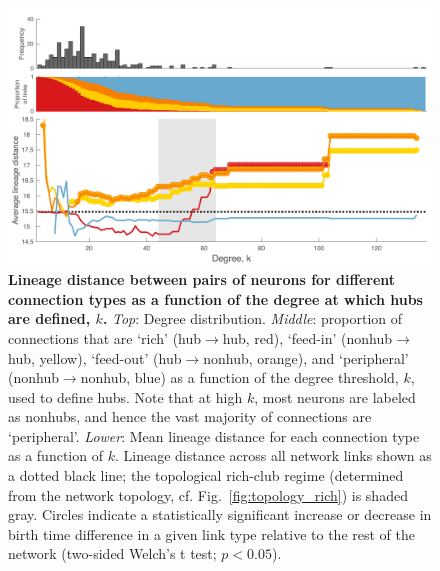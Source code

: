 \documentclass[10pt,letterpaper]{article}
\begin{document}
{%
\begin{figure}[!h]
\centering
    \includegraphics[width=1\textwidth]{lineageDistanceRPF.pdf}
    \caption{
    \textbf{Lineage distance between pairs of neurons for different connection types as a function of the degree at which hubs are defined, $k$.}
    \emph{Top}: Degree distribution.
\emph{Middle}: proportion of connections that are `rich' (hub$\rightarrow$hub, red), `feed-in' (nonhub$\rightarrow$hub, yellow), `feed-out' (hub$\rightarrow$nonhub, orange), and `peripheral' (nonhub$\rightarrow$nonhub, blue) as a function of the degree threshold, $k$, used to define hubs.
Note that at high $k$, most neurons are labeled as nonhubs, and hence the vast majority of connections are `peripheral'.
\emph{Lower}: Mean lineage distance for each connection type as a function of $k$.
Lineage distance across all network links shown as a dotted black line; the topological rich-club regime (determined from the network topology, cf. Fig.~\ref{fig:topology_rich}) is shaded gray.
Circles indicate a statistically significant increase or decrease in birth time difference in a given link type relative to the rest of the network (two-sided Welch’s t test; $p < 0.05$).
}
\label{fig:Lineagek}
\end{figure}

}
\end{document}
